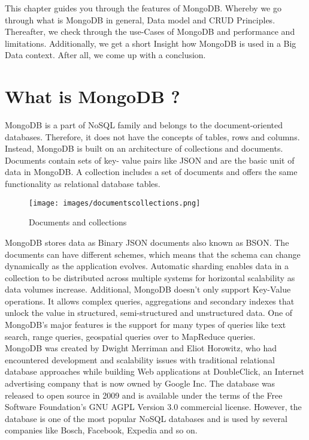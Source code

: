 This chapter guides you through the features of MongoDB. Whereby we go through what is MongoDB in general, Data model and CRUD Principles. Thereafter, we check through the use-Cases of MongoDB and performance and limitations. Additionally, we get a short Insight how MongoDB is used in a Big Data context. After all, we come up with a conclusion.

\section{What is MongoDB ?}
MongoDB is a part of NoSQL family and belongs to the document-oriented databases. Therefore, it does not have the concepts of tables, rows and columns. Instead, MongoDB is built on an architecture of collections and documents. Documents contain sets of key- value pairs like JSON and are the basic unit of data in MongoDB. A collection includes a set of documents and offers the same functionality as relational database tables\cite{Banker2016}.
\begin{figure}[H]
\texttt{[image: images/documentscollections.png]}
\caption{Documents and collections}
\end{figure}

MongoDB stores data as Binary JSON documents also known as BSON. The documents can have different schemes, which means that the schema can change dynamically as the application evolves. Automatic sharding enables data in a collection to be distributed across multiple systems for horizontal scalability as data volumes increase\cite{Edward2015}. Additional, MongoDB doesn’t only support Key-Value operations. It allows complex queries, aggregations and secondary indexes that unlock the value in structured, semi-structured and unstructured data. One of MongoDB’s major features is the support for many types of queries like text search, range queries, geospatial queries over to MapReduce queries\cite{MongoDBInc.2013a}.
\\
MongoDB was created by Dwight Merriman and Eliot Horowitz, who had encountered development and scalability issues with traditional relational database approaches while building Web applications at DoubleClick, an Internet advertising company that is now owned by Google Inc. The database was released to open source in 2009 and is available under the terms of the Free Software Foundation's GNU AGPL Version 3.0 commercial license. However, the database is one of the most popular NoSQL databases and is used by several companies like Bosch, Facebook, Expedia and so on\cite{Hows2013}.


